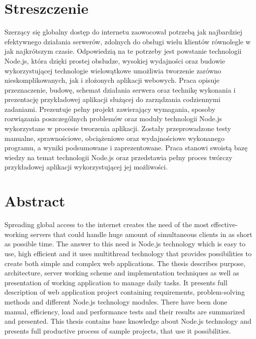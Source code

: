 \documentclass[12pt]{report}
\begin{document}
\section*{Streszczenie}
Szerzący się globalny dostęp do internetu zaowocował potrzebą jak najbardziej efektywnego działania serwerów, zdolnych do obsługi wielu klientów równolegle w jak najkrótszym czasie. 
Odpowiedzią na te potrzeby jest powstanie technologii Node.js, która dzięki prostej obsłudze, wysokiej wydajności oraz budowie wykorzystującej technologie wielowątkowe umożliwia tworzenie zarówno nieskomplikowanych, jak i złożonych aplikacji webowych. 
Praca opisuje przeznaczenie, budowę, schemat działania serwera oraz technikę wykonania i prezentację przykładowej aplikacji służącej do zarządzania codziennymi zadaniami. 
Prezentuje pełny projekt zawierający wymagania, sposoby rozwiązania poszczególnych problemów oraz moduły technologii Node.js wykorzystane w procesie tworzenia aplikacji. 
Zostały przeprowadzone testy manualne, sprawnościowe, obciążeniowe oraz wydajnościowe wykonanego programu, a wyniki podsumowane i zaprezentowane. 
\newline
Praca stanowi swoistą bazę wiedzy na temat technologii Node.js oraz przedstawia pełny proces twórczy przykładowej aplikacji wykorzystującej jej możliwości. 

\section*{Abstract}
Spreading global access to the internet creates the need of the most effective-working servers that could handle huge amount of simultaneous clients in as short as possible time.
The answer to this need is Node.js technology which is easy to use, high efficient and it uses multithread technology that provides possibilities to create both simple and complex web applications. 
The thesis describes purpose, architecture, server working scheme and implementation techniques as well as presentation of working application to manage daily tasks.
It presents full description of web application project containing requirements, problem-solving methods and different Node.js technology modules. 
There have been done manual, efficiency, load and performance tests and their results are summarized and presented. 
\newline
This thesis contains base knowledge about Node.js technology and presents full productive process of sample projects, that use it possibilities.
\end{document}
